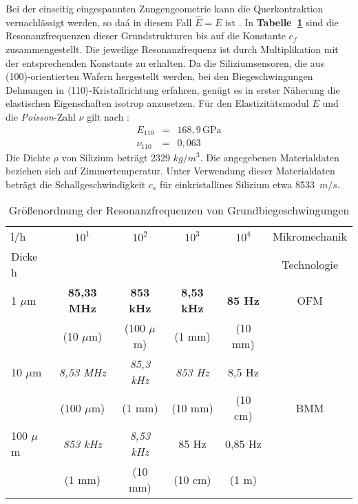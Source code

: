 Bei der einseitig eingespannten Zungengeometrie kann die Querkontraktion
vernachlässigt werden, so daá in diesem Fall $\hat E = E$ ist \cite{Ste91a}.
In {\bf Tabelle~\ref{tabresfreqanalyt}} sind die Resonanzfrequenzen
dieser Grundstrukturen
bis auf die Konstante $c_{f}$ zusammengestellt. Die jeweilige
Resonanzfrequenz ist durch Multiplikation mit der entsprechenden Konstante
zu erhalten. Da die Siliziumsensoren, die aus (100)-orientierten
Wafern hergestellt werden, bei den Biegeschwingungen Dehnungen in
$\langle$110$\rangle$-Kristallrichtung erfahren, genügt es in erster Näherung
die elastischen Eigenschaften isotrop anzusetzen. Für den Elastizitätsmodul
$E$ und die {\sl Poisson}-Zahl $\nu$ gilt nach \cite{Heu89}:
\begin{eqnarray}
\label{simat}
      E_{110}   & = & 168,9 \, \mbox{GPa}  \\
      \nu_{110} & = & 0,063 \nonumber
\end{eqnarray}
Die Dichte $\rho$ von Silizium beträgt 2329 $kg/m^{3}$. Die
angegebenen Materialdaten beziehen sich auf Zimmertemperatur.
Unter Verwendung dieser Materialdaten beträgt die Schallgeschwindigkeit
$c_{s}$ für einkristallines Silizium etwa 8533~$m/s$.
\begin{table}[htb]
\caption{\label{tabresfreqanalyt}
 Größenordnung der Resonanzfrequenzen von Grundbiegeschwingungen}
\begin{center}
\begin{tabular}{|l||c|c|c|c||c|}
\hline
 l/h & $10^{1}$ & $10^{2}$ & $10^{3}$ & $10^{4}$ & Mikromechanik \\
 Dicke h & & & & & Technologie \\
\hline \hline
 1 $\mu$m & {\bf 85,33 MHz} &  {\bf 853 kHz} & {\bf 8,53 kHz} & {\bf 85 Hz} & OFM \\
          & (10 $\mu$m)     & (100 $\mu$m)   & (1 mm)         & (10 mm) & \\
\hline \hline
 10 $\mu$m & {\em 8,53 MHz} & {\em 85,3 kHz} & {\em 853 Hz}   & 8,5 Hz &  \\
           & (100 $\mu$m)   & (1 mm)         & (10 mm)        & (10 cm) & BMM  \\
\cline{1-5}
 100 $\mu$m & {\em 853 kHz} & {\em 8,53 kHz} & 85 Hz          & 0,85 Hz & \\
            & (1 mm)        & (10 mm)        & (10 cm)        & (1 m) & \\
\hline
\end{tabular}
\end{center}
\end{table}
